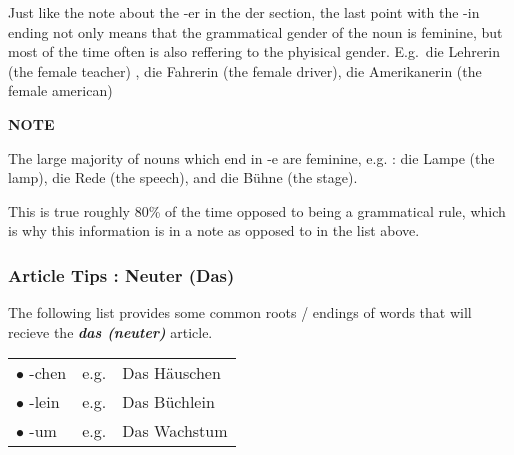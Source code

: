 \documentclass[a4paper,twocolumn,10pt]{article}
\newcommand{\newpar}
{\par \vspace{0.3cm}}
\begin{document}

Just like the note about the -er in the der section, the last point with the -in
ending not only means that the grammatical gender of the noun is
feminine, but most of the time often is also reffering to the phyisical gender.
E.g.\ die Lehrerin (the female teacher) , die Fahrerin (the female driver), die
Amerikanerin (the female american)

\nolinenumbers
\vspace{0.2cm}
\centering
\begin{note-bg}

	\begin{note-theword}
		{\footnotesize \textbf{NOTE} }
	\end{note-theword}

	\begin{note-content} \justifying The large majority of nouns which end in -e
		are feminine, e.g. : die Lampe (the lamp), die Rede (the speech), and
		die Bühne (the stage).\newpar

		This is true roughly 80\% of the time opposed to being a grammatical
		rule, which is why this information is in a note as opposed to in the
		list above.  \end{note-content}

\end{note-bg}
\linenumbers
\justifying



\subsubsection{Article Tips : Neuter (Das)}
\label{sssec:article_tips_neuter_das_}

The following list provides some common roots / endings of words that will
recieve the \textbf{\textit{das (neuter)}} article.


\nolinenumbers

\vspace{0.2cm}

\begin{tabularx}{\linewidth}{l r l}

\rowcolor{white} $\bullet$ -chen & e.g. & Das Häuschen \\
\rowcolor{white} $\bullet$ -lein & e.g. & Das Büchlein \\
\rowcolor{white} $\bullet$ -um & e.g. & Das Wachstum \\

\end{tabularx}
\end{document}
